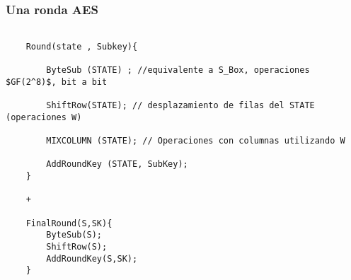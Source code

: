 \subsubsection{Una ronda AES}
\lstset{language=C, breaklines=true, basicstyle=\footnotesize}
\begin{lstlisting}[frame=single]

	Round(state , Subkey){
	
		ByteSub (STATE) ; //equivalente a S_Box, operaciones $GF(2^8)$, bit a bit
	
		ShiftRow(STATE); // desplazamiento de filas del STATE (operaciones W)
	
		MIXCOLUMN (STATE); // Operaciones con columnas utilizando W
	
		AddRoundKey (STATE, SubKey);
	} 
	
	+
	 
	FinalRound(S,SK){
		ByteSub(S);
		ShiftRow(S);
		AddRoundKey(S,SK);
	}
		
\end{lstlisting}
